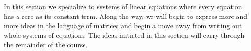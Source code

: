 %
\begin{introduction}
\begin{para}In this section we specialize to systems of linear equations where every equation has a zero as its constant term.  Along the way, we will begin to express more and more ideas in the language of matrices and begin a move away from writing out whole systems of equations.  The ideas initiated in this section will carry through the remainder of the course.\end{para}
\end{introduction}
%
